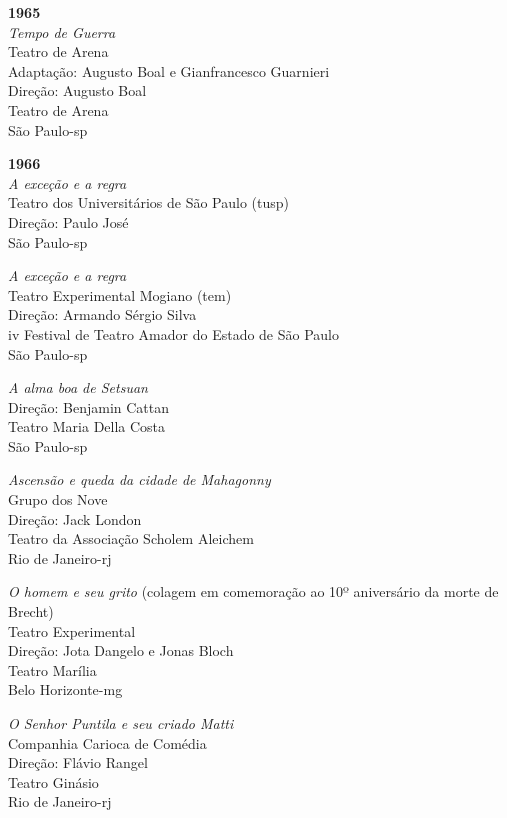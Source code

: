 \item{\bf 1965}\\
{\it Tempo de Guerra}\\
Teatro de Arena\\
Adaptação: Augusto Boal e Gianfrancesco Guarnieri\\
Direção: Augusto Boal\\
Teatro de Arena\\
São Paulo-{\sc sp}

\item{\bf 1966}\\
{\it A exceção e a regra}\\
Teatro dos Universitários de São Paulo ({\sc tusp})\\
Direção: Paulo José\\
São Paulo-{\sc sp}

{\it A exceção e a regra}\\
Teatro Experimental Mogiano ({\sc tem})\\
Direção: Armando Sérgio Silva\\
{\sc iv} Festival de Teatro Amador do Estado de São Paulo\\
São Paulo-{\sc sp}

{\it A alma boa de Setsuan}\\
Direção: Benjamin Cattan\\
Teatro Maria Della Costa\\
São Paulo-{\sc sp}

{\it Ascensão e queda da cidade de Mahagonny}\\
Grupo dos Nove\\
Direção: Jack London\\
Teatro da Associação Scholem Aleichem\\
Rio de Janeiro-{\sc rj}

{\it O homem e seu grito} (colagem em comemoração ao 10º aniversário da
morte de Brecht)\\
Teatro Experimental\\
Direção: Jota Dangelo e Jonas Bloch\\
Teatro Marília\\
Belo Horizonte-{\sc mg}

{\it O Senhor Puntila e seu criado Matti}\\
Companhia Carioca de Comédia\\
Direção: Flávio Rangel\\
Teatro Ginásio\\
Rio de Janeiro-{\sc rj}

